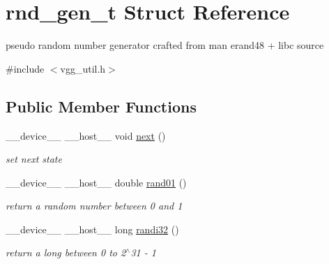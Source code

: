 \hypertarget{structrnd__gen__t}{}\section{rnd\+\_\+gen\+\_\+t Struct Reference}
\label{structrnd__gen__t}


pseudo random number generator crafted from man erand48 + libc source  




{\ttfamily \#include $<$vgg\+\_\+util.\+h$>$}

\subsection*{Public Member Functions}
\begin{DoxyCompactItemize}
\item 
\mbox{\label{structrnd__gen__t_a681dc7d8fb26a098dd79b00a731565e1}} 
\+\_\+\+\_\+device\+\_\+\+\_\+ \+\_\+\+\_\+host\+\_\+\+\_\+ void \hyperlink{structrnd__gen__t_a681dc7d8fb26a098dd79b00a731565e1}{next} ()
\begin{DoxyCompactList}\small\item\em set next state \end{DoxyCompactList}\item 
\mbox{\label{structrnd__gen__t_abcddd9ef63e9228770b4e6a77f1aaaa8}} 
\+\_\+\+\_\+device\+\_\+\+\_\+ \+\_\+\+\_\+host\+\_\+\+\_\+ double \hyperlink{structrnd__gen__t_abcddd9ef63e9228770b4e6a77f1aaaa8}{rand01} ()
\begin{DoxyCompactList}\small\item\em return a random number between 0 and 1 \end{DoxyCompactList}\item 
\mbox{\label{structrnd__gen__t_abb4b48e7a93b53df5af70476c07fe76f}} 
\+\_\+\+\_\+device\+\_\+\+\_\+ \+\_\+\+\_\+host\+\_\+\+\_\+ long \hyperlink{structrnd__gen__t_abb4b48e7a93b53df5af70476c07fe76f}{randi32} ()
\begin{DoxyCompactList}\small\item\em return a long between 0 to 2$^\wedge$31 -\/ 1 \end{DoxyCompactList}\item 
\mbox{\label{structrnd__gen__t_a0ccf64e18ecb0f64349863ec6883d9c2}} 

\end{DoxyCompactItemize}
